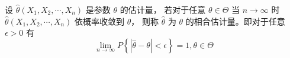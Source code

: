  设 $ \hat{\theta}(X_1, X_2, \cdots, X_n) $ 是参数 $ \theta $ 的估计量，
若对于任意 $ \theta \in \Theta $ 当 $ n \rightarrow \infty $ 时 $ \hat{\theta}(X_1, X_2, \cdots, X_n) $ 依概率收敛到 $ \theta $，
则称 $ \hat{\theta} $ 为 $ \theta $ 的相合估计量。即对于任意 $ \epsilon > 0 $ 有
\begin{equation}
    \lim_{n\rightarrow\infty} P\left\{ \left| \hat{\theta} - \theta \right| < \epsilon \right\}  = 1, \theta \in \Theta
\end{equation}
